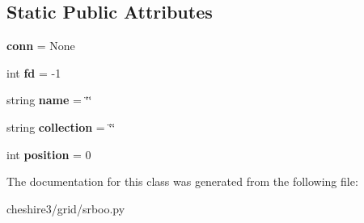 \subsection*{Static Public Attributes}
\begin{DoxyCompactItemize}
\item 
\hypertarget{classcheshire3_1_1grid_1_1srboo_1_1_srb_file_af353122a532f0b00b72cd207583aa97a}{{\bfseries conn} = None}\label{classcheshire3_1_1grid_1_1srboo_1_1_srb_file_af353122a532f0b00b72cd207583aa97a}

\item 
\hypertarget{classcheshire3_1_1grid_1_1srboo_1_1_srb_file_ac8be8e6cc1b99f48544bdf375a9f5ea4}{int {\bfseries fd} = -\/1}\label{classcheshire3_1_1grid_1_1srboo_1_1_srb_file_ac8be8e6cc1b99f48544bdf375a9f5ea4}

\item 
\hypertarget{classcheshire3_1_1grid_1_1srboo_1_1_srb_file_adc5bfb22cbfac0e8982f82ef05148a9d}{string {\bfseries name} = \char`\"{}\char`\"{}}\label{classcheshire3_1_1grid_1_1srboo_1_1_srb_file_adc5bfb22cbfac0e8982f82ef05148a9d}

\item 
\hypertarget{classcheshire3_1_1grid_1_1srboo_1_1_srb_file_abc6b746c3728d8bd3776c0a06edf6be6}{string {\bfseries collection} = \char`\"{}\char`\"{}}\label{classcheshire3_1_1grid_1_1srboo_1_1_srb_file_abc6b746c3728d8bd3776c0a06edf6be6}

\item 
\hypertarget{classcheshire3_1_1grid_1_1srboo_1_1_srb_file_a9680731d0ceb008f688f57b79348043b}{int {\bfseries position} = 0}\label{classcheshire3_1_1grid_1_1srboo_1_1_srb_file_a9680731d0ceb008f688f57b79348043b}

\end{DoxyCompactItemize}


The documentation for this class was generated from the following file\-:\begin{DoxyCompactItemize}
\item 
cheshire3/grid/srboo.\-py\end{DoxyCompactItemize}

